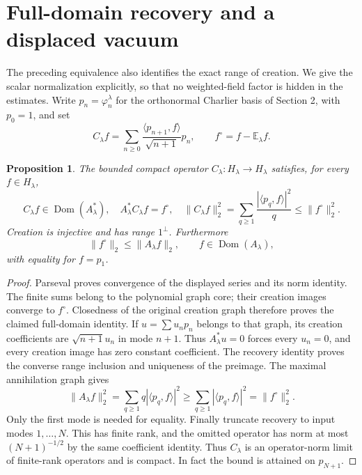 \documentclass[11pt]{article}
\newtheorem{proposition}[theorem]{Proposition}
\newcommand{\E}{\mathbb E}\newcommand{\Ent}{\operatorname{Ent}}
\newcommand{\Dom}{\operatorname{Dom}}
\begin{document}
\section{Full-domain recovery and a displaced vacuum}
The preceding equivalence also identifies the exact range of creation.
We give the scalar normalization explicitly, so that no weighted-field
factor is hidden in the estimates. Write $p_n=\varphi_n^\lambda$ for the
orthonormal Charlier basis of Section 2, with $p_0=1$, and set
\[
 C_\lambda f=\sum_{n\geq0}\frac{\langle p_{n+1},f\rangle}
 {\sqrt{n+1}}p_n,\qquad f^\circ=f-\E_\lambda f.
\]
\begin{proposition}\label{prop:recovery}
The bounded compact operator $C_\lambda:H_\lambda\to H_\lambda$
satisfies, for every $f\in H_\lambda$,
\[
 C_\lambda f\in\Dom(A_\lambda^*),\quad
 A_\lambda^*C_\lambda f=f^\circ,\quad
 \|C_\lambda f\|_2^2=
 \sum_{q\geq1}\frac{|\langle p_q,f\rangle|^2}{q}
 \leq\|f^\circ\|_2^2.
\]
Creation is injective and has range $1^\perp$. Furthermore
\[
 \|f^\circ\|_2\leq\|A_\lambda f\|_2,
 \qquad f\in\Dom(A_\lambda),
\]
with equality for $f=p_1$.
\end{proposition}
\begin{proof}
Parseval proves convergence of the displayed series and its norm
identity. The finite sums belong to the polynomial graph core; their
creation images converge to $f^\circ$. Closedness of the original
creation graph therefore proves the claimed full-domain identity.
If $u=\sum u_np_n$ belongs to that graph, its creation coefficients are
$\sqrt{n+1}u_n$ in mode $n+1$. Thus $A_\lambda^*u=0$ forces every
$u_n=0$, and every creation image has zero constant coefficient.
The recovery identity proves the converse range inclusion and uniqueness
of the preimage. The maximal annihilation graph gives
\[
 \|A_\lambda f\|_2^2
 =\sum_{q\geq1}q|\langle p_q,f\rangle|^2
 \geq\sum_{q\geq1}|\langle p_q,f\rangle|^2
 =\|f^\circ\|_2^2.
\]
Only the first mode is needed for equality. Finally truncate recovery
to input modes $1,\ldots,N$. This has finite rank, and the omitted
operator has norm at most $(N+1)^{-1/2}$ by the same coefficient
identity. Thus $C_\lambda$ is an operator-norm limit of finite-rank
operators and is compact. In fact the bound is attained on $p_{N+1}$.
\end{proof}
\end{document}
